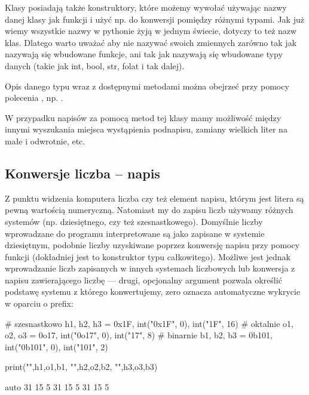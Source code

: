 Klasy posiadają także konstruktory, które możemy wywołać używając nazwy danej klasy jak funkcji i użyć np. do konwersji pomiędzy różnymi typami.
Jak już wiemy wszystkie nazwy w pythonie żyją w jednym świecie, dotyczy to też nazw klas.
Dlatego warto uważać aby nie nazywać swoich zmiennych zarówno tak jak nazywają się wbudowane funkcje, ani tak jak nazywają się wbudowane typy danych (takie jak int, bool, str, folat i tak dalej).

Opis danego typu wraz z dostępnymi metodami można obejrzeć przy pomocy polecenia , np. .

W przypadku napisów za pomocą metod tej klasy mamy możliwość między innymi wyszukania miejsca wystąpienia podnapisu, zamiany wielkich liter na małe i odwrotnie, etc.

\subsection{Konwersje liczba -- napis}

Z punktu widzenia komputera liczba czy też element napisu, którym jest litera są pewną wartością numeryczną.
Natomiast my do zapisu liczb używamy różnych systemów (np. dziesiętnego, czy też szesnastkowego).
Domyślnie liczby wprowadzane do programu interpretowane są jako zapisane w systemie dziesiętnym,
podobnie liczby uzyskiwane poprzez konwersję napisu przy pomocy funkcji  (dokładniej jest to konstruktor typu całkowitego).
Możliwe jest jednak wprowadzanie liczb zapisanych w innych systemach liczbowych lub konwersja z napisu zawierającego liczbę ---
drugi, opcjonalny argument  pozwala określić podstawę systemu z którego konwertujemy, zero oznacza automatyczne wykrycie w oparciu o prefix:

\begin{CodeFrame}[python]{0.7\textwidth}
# szesnastkowo
h1, h2, h3 = 0x1F, int("0x1F", 0), int("1F", 16)
# oktalnie
o1, o2, o3 = 0o17, int("0o17", 0), int("17", 8)
# binarnie
b1, b2, b3 = 0b101, int("0b101", 0), int("101", 2)

print("",h1,o1,b1, "\n",h2,o2,b2, "\n",h3,o3,b3)
\end{CodeFrame}
\begin{CodeFrame}{auto}
 31 15 5
 31 15 5
 31 15 5
\end{CodeFrame}

